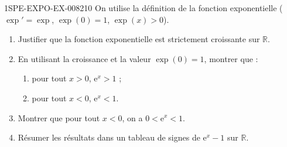 \begin{exercice}{1SPE-EXPO-EX-008}{2}{10}
On utilise la définition de la fonction exponentielle ($\exp' = \exp$, $\exp(0) = 1$, $\exp(x) > 0$).
\begin{enumerate}
\item Justifier que la fonction exponentielle est strictement croissante sur $\mathbb{R}$.
\item En utilisant la croissance et la valeur $\exp(0) = 1$, montrer que :
  \begin{enumerate}
  \item pour tout $x > 0$, $\mathrm{e}^x > 1$ ;
  \item pour tout $x < 0$, $\mathrm{e}^x < 1$.
  \end{enumerate}
\item Montrer que pour tout $x < 0$, on a $0 < \mathrm{e}^x < 1$.
\item Résumer les résultats dans un tableau de signes de $\mathrm{e}^x - 1$ sur $\mathbb{R}$.
\end{enumerate}
\end{exercice}
